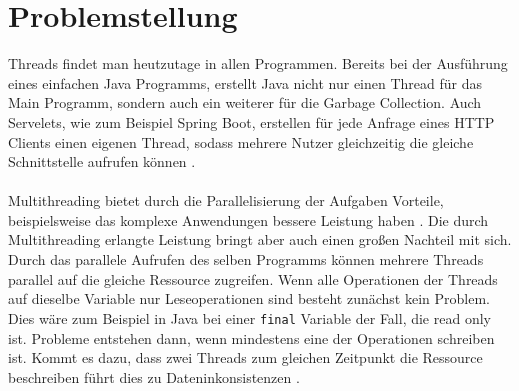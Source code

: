\section{Problemstellung}

Threads findet man heutzutage in allen Programmen. Bereits bei der Ausführung eines einfachen Java Programms, erstellt Java nicht nur einen Thread für das Main Programm, sondern auch ein weiterer für die Garbage Collection. Auch Servelets, wie zum Beispiel Spring Boot, erstellen für jede Anfrage eines HTTP Clients einen eigenen Thread, sodass mehrere Nutzer gleichzeitig die gleiche Schnittstelle aufrufen können \cite[vgl.][8]{brian}.\\
\\
Multithreading bietet durch die Parallelisierung der Aufgaben Vorteile, beispielsweise das komplexe Anwendungen bessere Leistung haben \cite[vgl.][3]{brian}. Die durch Multithreading erlangte Leistung bringt aber auch einen großen Nachteil mit sich. Durch das parallele Aufrufen des selben Programms können mehrere Threads parallel auf die gleiche Ressource zugreifen. Wenn alle Operationen der Threads auf dieselbe Variable nur Leseoperationen sind besteht zunächst kein Problem. Dies wäre zum Beispiel in Java  bei einer \texttt{final} Variable der Fall, die read only ist. Probleme entstehen dann, wenn mindestens eine der Operationen schreiben ist. Kommt es dazu, dass zwei Threads zum gleichen Zeitpunkt die Ressource beschreiben führt dies zu Dateninkonsistenzen \cite[vgl.][11-15]{brian}.